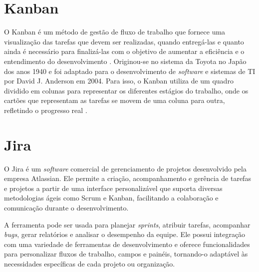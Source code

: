\section{Kanban}

O Kanban é um método de gestão de fluxo de trabalho que fornece uma visualização das tarefas que devem ser realizadas, quando entregá-las e quanto ainda é necessário para finalizá-las com o objetivo de aumentar a eficiência e o entendimento do desenvolvimento \cite{ohno1988toyota}. Originou-se no sistema da Toyota no Japão dos anos 1940 e foi adaptado para o desenvolvimento de \textit{software} e sistemas de TI por David J. Anderson em 2004. Para isso, o Kanban utiliza de um quadro dividido em colunas para representar os diferentes estágios do trabalho, onde os cartões que representam as tarefas se movem de uma coluna para outra, refletindo o progresso real \cite{zayat2020framework}.

\section{Jira}

O Jira é um \textit{software} comercial de gerenciamento de projetos desenvolvido pela empresa Atlassian. Ele permite a criação, acompanhamento e gerência de tarefas e projetos a partir de uma interface personalizável que suporta diversas metodologias ágeis como Scrum e Kanban, facilitando a colaboração e comunicação durante o desenvolvimento.

A ferramenta pode ser usada para planejar \textit{sprints}, atribuir tarefas, acompanhar \textit{bugs}, gerar relatórios e analisar o desempenho da equipe. Ele possui integração com uma variedade de ferramentas de desenvolvimento e oferece funcionalidades para personalizar fluxos de trabalho, campos e painéis, tornando-o adaptável às necessidades específicas de cada projeto ou organização.
